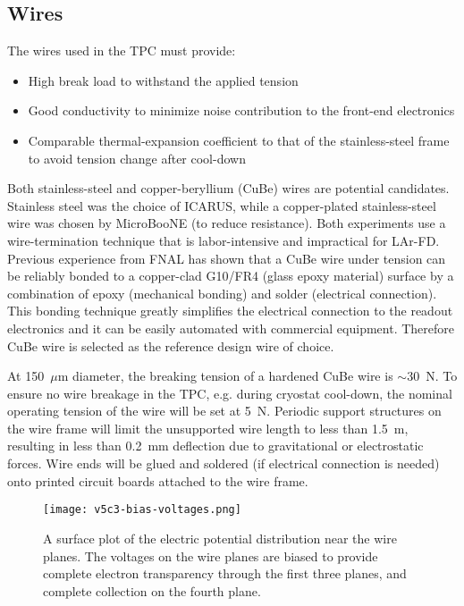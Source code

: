 \subsection{Wires}

The wires used in the TPC must provide:
\begin{itemize}
\item High break load to withstand the applied tension 
\item Good conductivity to minimize noise contribution to the front-end electronics
\item Comparable thermal-expansion coefficient to that of the stainless-steel 
frame to avoid tension change after cool-down
\end{itemize}

Both stainless-steel and copper-beryllium (CuBe) wires are potential candidates.  
Stainless steel was the choice of ICARUS, while a copper-plated 
stainless-steel wire was chosen by MicroBooNE  (to reduce resistance).  Both experiments use a wire-termination 
technique that is labor-intensive and impractical for LAr-FD. Previous experience from FNAL \cite{FNAL-proto-APA} has shown that a CuBe wire under 
tension can be reliably bonded to a copper-clad G10/FR4 (glass epoxy material) surface by a combination of  epoxy (mechanical bonding) 
and solder (electrical connection).  This bonding technique greatly simplifies the electrical 
connection to the readout electronics and it can be easily automated 
with commercial equipment.  Therefore CuBe wire is 
selected as the reference design wire of choice.

At 150~$\mu$m diameter,  the breaking tension of a hardened CuBe wire is $\sim$30~N.  
To ensure no wire breakage in the TPC, e.g. during cryostat cool-down, the nominal operating tension of the wire will be set at 5~N.  Periodic support structures on the wire frame will
limit the unsupported wire length to less than 1.5~m, resulting in less than 0.2~mm deflection due to gravitational or electrostatic forces.  Wire ends will be glued and soldered (if electrical connection is needed) 
onto printed circuit boards attached to the wire frame.

\begin{figure}[htbp]
\centering
\texttt{[image: v5c3-bias-voltages.png]}
\caption[Plot of electric potential distribution near the wire planes]{A surface plot of the electric potential distribution near the wire planes.  The voltages on the wire planes are biased to provide complete electron transparency through the first three planes, and complete collection on the fourth plane. }
\label{fig:tpc-bias-voltages}
\end{figure}

